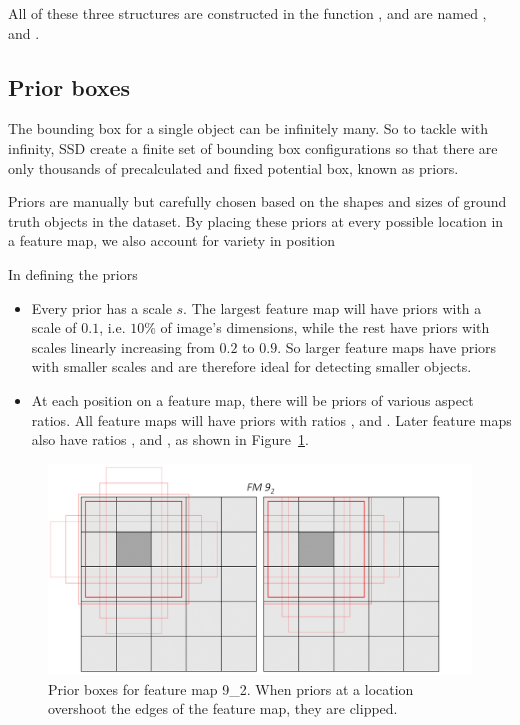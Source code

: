 \documentclass[journal,conference]{IEEEtran}
\begin{document}
All of these three structures are constructed in the function , and are named ,  and .

\subsection{Prior boxes}
The bounding box for a single object can be infinitely many. So to tackle with infinity, SSD create a finite set of bounding box configurations so that there are only thousands of precalculated and fixed potential box, known as priors.

Priors are manually but carefully chosen based on the shapes and sizes of ground truth objects in the dataset. By placing these priors at every possible location in a feature map, we also account for variety in position

In defining the priors
\begin{itemize}
  \item Every prior has a scale $s$. The largest feature map  will have priors with a scale of $0.1$, i.e. $10\%$ of image's dimensions, while the rest have priors with scales linearly increasing from $0.2$ to $0.9$. So larger feature maps have priors with smaller scales and are therefore ideal for detecting smaller objects.
  \item At each position on a feature map, there will be priors of various aspect ratios. All feature maps will have priors with ratios ,  and . Later feature maps also have ratios ,  and , as shown in Figure~\ref{fig:prior}.
\end{itemize}

\begin{figure}[htbp]
  \centering
  \includegraphics[width=\linewidth]{fig/priors2.jpg}
  \caption{Prior boxes for feature map 9\_2. When priors at a location overshoot the edges of the feature map, they are clipped.}\label{fig:prior}
\end{figure}
\end{document}

